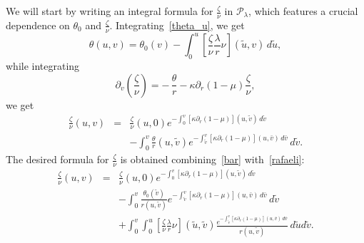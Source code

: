 \documentclass[a4paper,11pt,oneside,reqno]{amsart}
\newcommand{\cal}{\mathcal}
\begin{document}
We will start by writing an integral formula for $\frac{\zeta}{\nu}$ in ${\cal P}_\lambda$, which features a crucial dependence on $\theta_0$ and $\frac{\zeta}{\nu}$. Integrating~\eqref{theta_u}, we get
\begin{equation}
\label{bar}
\theta(u,v)=\theta_0(v)-\int_0^u\left[\frac{\zeta}{\nu}\frac{\lambda}{r}\nu\right](\tilde u,v)\,d\tilde u,
\end{equation}
while integrating
\begin{equation}\label{zeta_nu}
\partial_v\left(\frac{\zeta}{\nu}\right)=-\,\frac{\theta}{r}-\kappa\partial_r(1-\mu)\frac{\zeta}{\nu},
\end{equation}
we get
\begin{eqnarray}
\frac{\zeta}{\nu}(u,v)&=&\frac{\zeta}{\nu}(u,0)e^{-\int_0^v[\kappa\partial_r(1-\mu)](u,\tilde v)\,d\tilde v}\nonumber\\
&&-\int_0^v\frac{\theta}{r}(u,\tilde v)e^{-\int_{\tilde v}^v[\kappa\partial_r(1-\mu)](u,\bar v)\,d\bar v}\,d\tilde v.
\label{rafaeli}
\end{eqnarray}
The desired formula for $\frac{\zeta}{\nu}$ is obtained combining~\eqref{bar} with~\eqref{rafaeli}:
\begin{eqnarray}
\frac{\zeta}{\nu}(u,v)&=&\frac{\zeta}{\nu}(u,0)e^{-\int_0^v[\kappa\partial_r(1-\mu)](u,\tilde v)\,d\tilde v}\nonumber\\
&&-\int_0^v\frac{\theta_0(\tilde v)}{r(u,\tilde v)}e^{-\int_{\tilde v}^v[\kappa\partial_r(1-\mu)](u,\bar v)
\,d\bar v}\,d\tilde v\nonumber\\
&&+\int_0^v\int_0^u\left[\frac{\zeta}{\nu}\frac{\lambda}{r}\nu\right](\tilde u,\tilde v)\frac{e^{-\int_{\tilde v}^v[\kappa\partial_r(1-\mu)](u,\bar v)
\,d\bar v}}{r(u,\tilde v)}\,d\tilde ud\tilde v.\label{adele}
\end{eqnarray}
\end{document}
